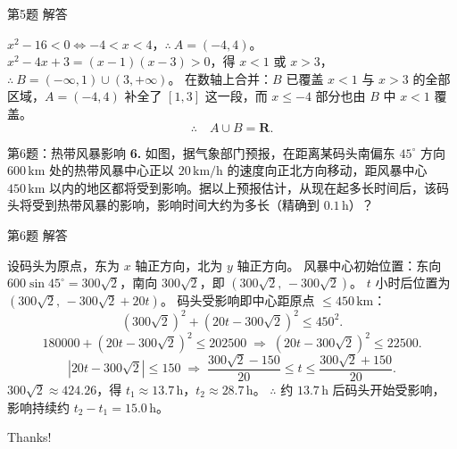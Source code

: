 \documentclass[10pt,aspectratio=169,serif]{beamer}
\begin{document}
\begin{frame}[t]{第5题 解答}
\begin{tcolorbox}[colback=orange!10,colframe=orange,title=\textbf{解}]
$x^{2}-16<0 \Longleftrightarrow -4<x<4$，$\therefore\ A=(-4,4)$。
\vspace{0.3em}
$x^{2}-4x+3=(x-1)(x-3)>0$，得 $x<1$ 或 $x>3$，
$\therefore\ B=(-\infty,1)\cup(3,+\infty)$。
\vspace{0.5em}
在数轴上合并：$B$ 已覆盖 $x<1$ 与 $x>3$ 的全部区域，$A=(-4,4)$ 补全了 $[1,3]$ 这一段，而 $x\le -4$ 部分也由 $B$ 中 $x<1$ 覆盖。
\[
\therefore\quad A\cup B=\mathbf{R}.
\]
\end{tcolorbox}
\end{frame}

\begin{frame}[t]{第6题：热带风暴影响}
\textbf{6.} 如图，据气象部门预报，在距离某码头南偏东 $45^{\circ}$ 方向 $600\,\text{km}$ 处的热带风暴中心正以 $20\,\text{km/h}$ 的速度向正北方向移动，距风暴中心 $450\,\text{km}$ 以内的地区都将受到影响。据以上预报估计，从现在起多长时间后，该码头将受到热带风暴的影响，影响时间大约为多长（精确到 $0.1\,\text{h}$）？
\end{frame}

\begin{frame}[t]{第6题 解答}
\begin{tcolorbox}[colback=orange!10,colframe=orange,title=\textbf{解}]
设码头为原点，东为 $x$ 轴正方向，北为 $y$ 轴正方向。
风暴中心初始位置：东向 $600\sin45^{\circ}=300\sqrt{2}$，南向 $300\sqrt{2}$，即 $(300\sqrt{2},\,-300\sqrt{2})$。
$t$ 小时后位置为 $(300\sqrt{2},\,-300\sqrt{2}+20t)$。
码头受影响即中心距原点 $\le 450\,\text{km}$：
\[
(300\sqrt{2})^{2}+(20t-300\sqrt{2})^{2}\le 450^{2}.
\]
\[
180000+(20t-300\sqrt{2})^{2}\le 202500
\;\Longrightarrow\;
(20t-300\sqrt{2})^{2}\le 22500.
\]
\[
|20t-300\sqrt{2}|\le 150
\;\Longrightarrow\;
\frac{300\sqrt{2}-150}{20}\le t\le \frac{300\sqrt{2}+150}{20}.
\]
$300\sqrt{2}\approx 424.26$，得 $t_{1}\approx 13.7\,\text{h}$，$t_{2}\approx 28.7\,\text{h}$。
\vspace{0.3em}
$\therefore$ 约 \alert{$13.7\,\text{h}$} 后码头开始受影响，影响持续约 $t_{2}-t_{1}=15.0\,\text{h}$。
\end{tcolorbox}
\end{frame}

\begin{frame}[c]
  \begin{center}
    {\Huge\calligra Thanks!}
  \end{center}
\end{frame}
\end{document}
